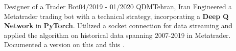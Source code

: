\resumeSubheadingReza
{Designer of a Trader Bot}{04/2019 - 01/2020}
{QDM}{Tehran, Iran}
{Engineered a Metatrader trading bot with a technical strategy, incorporating a \textbf{Deep Q Network} in \textbf{PyTorch}. Utilized a socket connection for data streaming and applied the algorithm on historical data spanning 2007-2019 in Metatrader. Documented a version on this  and this .}

